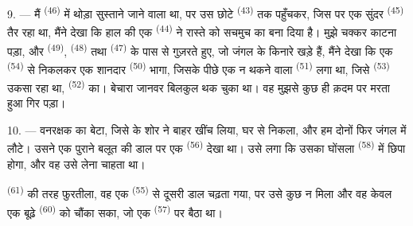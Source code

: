 9. --- मैं  \textsuperscript{(46)} में थोड़ा सुस्ताने जाने
वाला था, पर उस छोटे  \textsuperscript{(43)} तक पहुँचकर, जिस पर एक
सुंदर  \textsuperscript{(45)} तैर रहा था, मैंने देखा कि हाल की एक
 \textsuperscript{(44)} ने रास्ते को सचमुच का  बना दिया
है। मुझे चक्कर काटना पड़ा, और  \textsuperscript{(49)},
 \textsuperscript{(48)} तथा  \textsuperscript{(47)} के
पास से गुज़रते हुए, जो जंगल के किनारे खड़े हैं, मैंने देखा कि एक
 \textsuperscript{(54)} से निकलकर एक शानदार 
\textsuperscript{(50)} भागा, जिसके पीछे एक न थकने वाला  \textsuperscript{(51)} लगा था, जिसे  \textsuperscript{(53)} उकसा रहा था,
 \textsuperscript{(52)} का।
बेचारा जानवर बिलकुल थक चुका था। वह मुझसे कुछ ही क़दम पर मरता हुआ गिर पड़ा।

10. --- वनरक्षक का बेटा, जिसे  के शोर ने बाहर खींच लिया, घर से
निकला, और हम दोनों फिर जंगल में लौटे। उसने एक पुराने बलूत की डाल पर एक
 \textsuperscript{(56)} देखा था। उसे लगा कि उसका घोंसला
 \textsuperscript{(58)} में छिपा होगा, और वह उसे लेना चाहता था।

 \textsuperscript{(61)} की तरह फुरतीला, वह एक 
\textsuperscript{(55)} से दूसरी डाल चढ़ता गया, पर उसे कुछ न मिला और वह केवल एक बूढ़े
 \textsuperscript{(60)} को चौंका सका, जो एक 
\textsuperscript{(57)} पर बैठा था।
\VUsaut{4.0mm}
\VUfilet{22mm}

